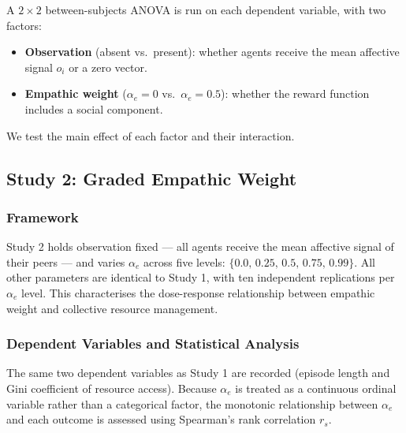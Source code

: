 A $2 \times 2$ between-subjects ANOVA is run on each dependent variable,
with two factors:
\begin{itemize}
    \item \textbf{Observation} (absent vs.\ present): whether agents receive
          the mean affective signal $o_i$ or a zero vector.
    \item \textbf{Empathic weight} ($\alpha_e = 0$ vs.\ $\alpha_e = 0.5$):
          whether the reward function includes a social component.
\end{itemize}
We test the main effect of each factor and their interaction.

\subsection{Study 2: Graded Empathic Weight}

\subsubsection{Framework}

Study 2 holds observation fixed --- all agents receive the mean affective
signal of their peers --- and varies $\alpha_e$ across five levels:
$\{0.0,\, 0.25,\, 0.5,\, 0.75,\, 0.99\}$. All other parameters are
identical to Study 1, with ten independent replications per $\alpha_e$ level.
This characterises the dose-response relationship between empathic weight and
collective resource management.

\subsubsection{Dependent Variables and Statistical Analysis}

The same two dependent variables as Study 1 are recorded (episode length
and Gini coefficient of resource access). Because $\alpha_e$ is treated
as a continuous ordinal variable rather than a categorical factor, the
monotonic relationship between $\alpha_e$ and each outcome is assessed
using Spearman's rank correlation $r_s$.
